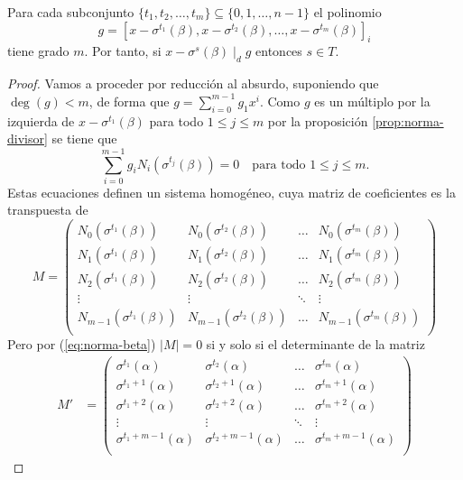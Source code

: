 \begin{lemma}
  \label{lem:pol-t-beta}
  Para cada subconjunto \(\{t_1, t_2, \dots, t_m\} \subseteq \{0, 1, \dots, n - 1\}\) el polinomio 
  \[
    g = \left[x - \sigma^{t_1}(\beta), x - \sigma^{t_{2}}(\beta), \dots, x - \sigma^{t_m}(\beta)\right]_{i}
  \]
  tiene grado \(m\).
  Por tanto, si \(x - \sigma^s(\beta) \mid_d g\) entonces \(s \in T\).
\end{lemma}

\begin{proof}
  Vamos a proceder por reducción al absurdo, suponiendo que \(\deg(g) < m\), de forma que \(g = \sum_{i=0}^{m-1}g_1x^{i}\).
  Como \(g\) es un múltiplo por la izquierda de \(x - \sigma^{t_1}(\beta )\) para todo \(1 \leq j \leq m\) por la proposición \ref{prop:norma-divisor} se tiene que
  \[
    \sum_{i=0}^{m-1}g_iN_i(\sigma^{t_j}(\beta)) = 0 \quad\text{para todo } 1 \leq j \leq m.
  \]
  Estas ecuaciones definen un sistema homogéneo, cuya matriz de coeficientes es la transpuesta de 
  \[
    M = \begin{pmatrix}
      N_0(\sigma^{t_1}(\beta)) & N_0(\sigma^{t_2}(\beta)) & \dots & N_0(\sigma^{t_m}(\beta))\\
      N_1(\sigma^{t_1}(\beta)) & N_1(\sigma^{t_2}(\beta)) & \dots & N_1(\sigma^{t_m}(\beta))\\
      N_2(\sigma^{t_1}(\beta)) & N_2(\sigma^{t_2}(\beta)) & \dots & N_2(\sigma^{t_m}(\beta))\\
      \vdots & \vdots & \ddots & \vdots \\
      N_{m-1}(\sigma^{t_1}(\beta)) & N_{m-1}(\sigma^{t_2}(\beta)) & \dots & N_{m-1}(\sigma^{t_m}(\beta))\\
    \end{pmatrix}
  \]
  Pero por (\ref{eq:norma-beta}) \(|M| = 0\) si y solo si el determinante de la matriz
  \begin{align*}
    M' &= \begin{pmatrix}
      \sigma^{t_1}(\alpha) & \sigma^{t_2}(\alpha) & \dots & \sigma^{t_m}(\alpha)\\
      \sigma^{t_1+1}(\alpha) & \sigma^{t_2+1}(\alpha) & \dots & \sigma^{t_m+1}(\alpha)\\
      \sigma^{t_1+2}(\alpha) & \sigma^{t_2+2}(\alpha) & \dots & \sigma^{t_m+2}(\alpha)\\
      \vdots & \vdots & \ddots & \vdots \\
      \sigma^{t_1+m-1}(\alpha) & \sigma^{t_2+m-1}(\alpha) & \dots & \sigma^{t_m+m-1}(\alpha)\\

\end{pmatrix}
\end{align*}
\end{proof}
